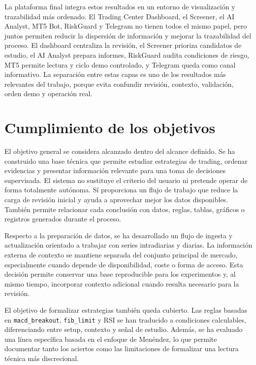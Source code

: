 La plataforma final integra estos resultados en un entorno de visualizaci\'on y
trazabilidad m\'as ordenado. El Trading Center Dashboard, el Screener, el AI Analyst, MT5 Bot,
RiskGuard y Telegram no tienen todos el mismo papel, pero juntos permiten
reducir la dispersi\'on de informaci\'on y mejorar la trazabilidad del proceso. El
dashboard centraliza la revisi\'on, el Screener prioriza candidatos de estudio, el
AI Analyst prepara informes, RiskGuard audita condiciones de riesgo, MT5 permite
lectura y ciclo demo controlado, y Telegram queda como canal informativo. La
separaci\'on entre estas capas es uno de los resultados m\'as relevantes del
trabajo, porque evita confundir revisi\'on, contexto, validaci\'on, orden demo y
operaci\'on real.

\section{Cumplimiento de los objetivos}

El objetivo general se considera alcanzado dentro del alcance definido. Se ha
construido una base t\'ecnica que permite estudiar estrategias de trading,
ordenar evidencias y presentar informaci\'on relevante para una toma de
decisiones supervisada. El sistema no sustituye el criterio del usuario ni
pretende operar de forma totalmente aut\'onoma. S\'i proporciona un flujo de
trabajo que reduce la carga de revisi\'on inicial y ayuda a aprovechar mejor los
datos disponibles. Tambi\'en permite relacionar cada conclusi\'on
con datos, reglas, tablas, gr\'aficos o registros generados durante el proceso.

Respecto a la preparaci\'on de datos, se ha desarrollado un flujo de ingesta y
actualizaci\'on orientado a trabajar con series intradiarias y diarias. La
informaci\'on externa de contexto se mantiene separada del conjunto principal de
mercado, especialmente cuando depende de disponibilidad, coste o forma de
acceso. Esta decisi\'on permite conservar una base reproducible para los
experimentos y, al mismo tiempo, incorporar contexto adicional cuando resulta
necesario para la revisi\'on.

El objetivo de formalizar estrategias tambi\'en queda cubierto. Las reglas
basadas en \texttt{macd\_breakout}, \texttt{fib\_limit} y RSI se han traducido a
condiciones calculables, diferenciando entre setup, contexto y se\~nal de
estudio. Adem\'as, se ha evaluado una l\'inea espec\'ifica basada en el enfoque de
Men\'endez, lo que permite documentar tanto los aciertos como las limitaciones de
formalizar una lectura t\'ecnica m\'as discrecional.

